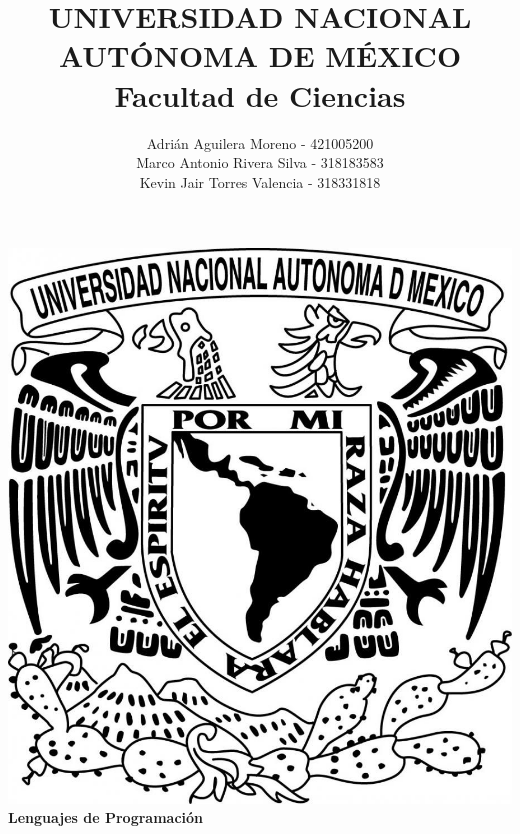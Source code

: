 \title{UNIVERSIDAD NACIONAL AUT\'ONOMA DE M\'EXICO\\ Facultad de Ciencias}
\author{ Adri\'an Aguilera Moreno   - 421005200 \\
         Marco Antonio Rivera Silva - 318183583\\
         Kevin Jair Torres Valencia - 318331818}
\date{}
\maketitle
\begin{center}
  \includegraphics[scale=0.20]{../Portada/Portada}\\[0.4cm]
  \Large
  \bf{Lenguajes de Programación}
  \normalsize
\end{center}
\newpage
{}


